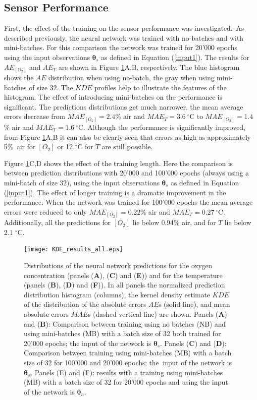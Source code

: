 \documentclass[sensors,article,accept,moreauthors,pdftex,10pt,a4paper]{Definitions/mdpi}
\theoremstyle{definition}
\begin{document}
\subsection{Sensor Performance}

First, the effect of the training on the sensor performance was investigated.~As described previously, the neural network was trained with no-batches and with mini-batches. For this comparison the network was trained for 20'000 epochs using the input observations ${\pmb \theta}_s$ as defined in Equation (\ref{input1}). The results for $AE_{[O_2]}$ and $AE_T$ are shown in Figure \ref{fig:KDE_results_all}A,B, respectively. The blue histogram shows the $AE$ distribution when using no-batch, the gray when using mini-batches of size 32. The $KDE$ profiles help to illustrate the features of the histogram. The effect of introducing mini-batches on the performance is significant. The predictions distributions get much narrower, the mean average errors decrease from $MAE_{[O_2]}=2.4$\% air and $MAE_{T}=3.6 \ ^\circ$C to $MAE_{[O_2]}=1.4$\% air and $MAE_{T}=1.6 \ ^\circ$C. Although the performance is significantly improved, from Figure \ref{fig:KDE_results_all}A,B it can also be clearly seen that errors as high as approximately 5\%~air for $[O_2]$ or 12 $^\circ$C for $T$ are still possible.



Figure \ref{fig:KDE_results_all}C,D shows the effect of the training length. Here the comparison is between prediction distributions with 20'000 and 100'000 epochs (always using a mini-batch of size 32), using the input observations ${\pmb \theta}_s$ as defined in Equation (\ref{input1}). The effect of longer training is a dramatic improvement in the performance. When the network was trained for 100'000 epochs the mean average errors were reduced to only $MAE_{[O_2]}=0.22$\% air and $MAE_{T}=0.27  \ ^\circ$C. Additionally, all the predictions for $[O_2]$ lie below 0.94\% air, and for $T$ lie below 2.1 $^\circ$C.

\begin{figure}[H]
\centering
\texttt{[image: KDE\_results\_all.eps]}
\caption{Distributions of the neural network predictions for the oxygen concentration (panels (\textbf{A}), (\textbf{C}) and (\textbf{E})) and for the temperature (panels (\textbf{B}), (\textbf{D}) and (\textbf{F})). In all panels the normalized prediction distribution histogram (columns), the kernel density estimate $KDE$ of the distribution of the absolute errors $AE$s (solid line), and mean absolute errors $MAE$s (dashed vertical line) are shown. Panels (\textbf{A}) and (\textbf{B}): Comparison between training using no batches (NB) and using mini-batches (MB) with a batch size of 32 both trained for 20'000 epochs; the input of the network is ${\pmb \theta}_s$. Panels (\textbf{C}) and (\textbf{D}): Comparison between training using mini-batches (MB) with a batch size of 32 for 100'000 and 20'000 epochs; the~input of the network is ${\pmb \theta}_s$. Panels (E) and (F): results with a training using mini-batches (MB) with a batch size of 32 for 20'000 epochs and using the input of the network is ${\pmb \theta}_n$.}
\label{fig:KDE_results_all}
\end{figure}
\end{document}
